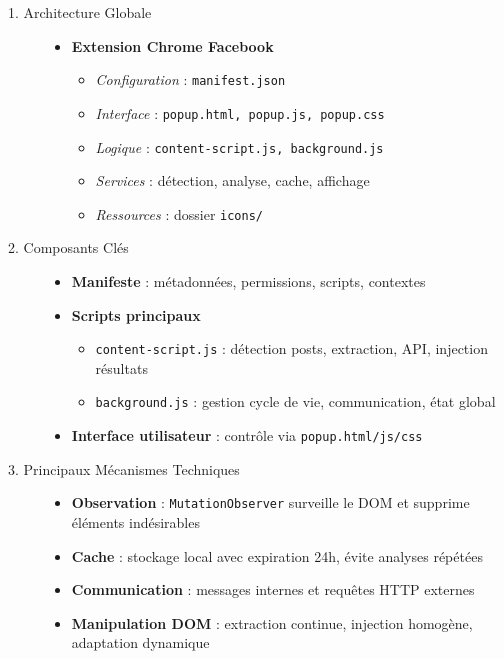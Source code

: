 \begin{description}
    \item[1. Architecture Globale] 
    \begin{itemize}
        \item \textbf{Extension Chrome Facebook}
        \begin{itemize}
            \item \textit{Configuration} : \texttt{manifest.json}
            \item \textit{Interface} : \texttt{popup.html, popup.js, popup.css}
            \item \textit{Logique} : \texttt{content-script.js, background.js}
            \item \textit{Services} : détection, analyse, cache, affichage
            \item \textit{Ressources} : dossier \texttt{icons/}
        \end{itemize}
    \end{itemize}
    
    \item[2. Composants Clés]
    \begin{itemize}
        \item \textbf{Manifeste} : métadonnées, permissions, scripts, contextes
        \item \textbf{Scripts principaux}
        \begin{itemize}
            \item \texttt{content-script.js} : détection posts, extraction, API, injection résultats
            \item \texttt{background.js} : gestion cycle de vie, communication, état global
        \end{itemize}
        \item \textbf{Interface utilisateur} : contrôle via \texttt{popup.html/js/css}
    \end{itemize}
    
    \item[3. Principaux Mécanismes Techniques]
    \begin{itemize}
        \item \textbf{Observation} : \texttt{MutationObserver} surveille le DOM et supprime éléments indésirables
        \item \textbf{Cache} : stockage local avec expiration 24h, évite analyses répétées
        \item \textbf{Communication} : messages internes et requêtes HTTP externes
        \item \textbf{Manipulation DOM} : extraction continue, injection homogène, adaptation dynamique
    \end{itemize}
    

\end{description}
